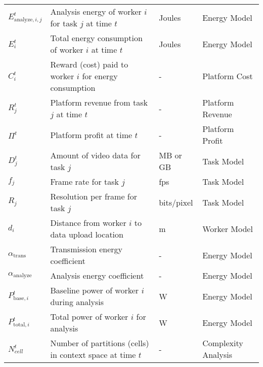 \begin{table*}[t]
\begin{tabular}{llll}
$E_{\text{analyze},i,j}^t$ & Analysis energy of worker $i$ for task $j$ at time $t$ & Joules & Energy Model \\
$E_i^t$ & Total energy consumption of worker $i$ at time $t$ & Joules & Energy Model \\
$C_i^t$ & Reward (cost) paid to worker $i$ for energy consumption & - & Platform Cost \\
$R_j^t$ & Platform revenue from task $j$ at time $t$ & - & Platform Revenue \\
$\Pi^t$ & Platform profit at time $t$ & - & Platform Profit \\
$D_j^t$ & Amount of video data for task $j$ & MB or GB & Task Model \\
$f_j$ & Frame rate for task $j$ & fps & Task Model \\
$R_j$ & Resolution per frame for task $j$ & bits/pixel & Task Model \\
$d_i$ & Distance from worker $i$ to data upload location & m & Worker Model \\
$\alpha_{\text{trans}}$ & Transmission energy coefficient & - & Energy Model \\
$\alpha_{\text{analyze}}$ & Analysis energy coefficient & - & Energy Model \\
$P_{\text{base}, i}^t$ & Baseline power of worker $i$ during analysis & W & Energy Model \\
$P_{\text{total}, i}^t$ & Total power of worker $i$ for analysis & W & Energy Model \\
$N_{cell}^t$& Number of partitions (cells) in context space at time $t$ & - & Complexity Analysis \\
\bottomrule
\end{tabular}
\end{table*}
